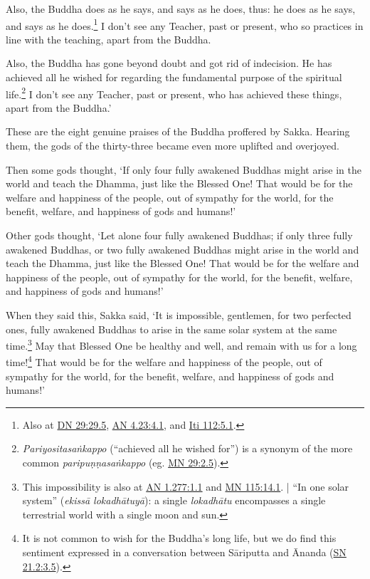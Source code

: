\documentclass[12pt,openany]{book}%
\begin{document}
Also, the Buddha does as he says, and says as he does, thus: he does as he says, and says as he does.\footnote{Also at \href{https://suttacentral.net/dn29/en/sujato\#29.5}{DN 29:29.5}, \href{https://suttacentral.net/an4.23/en/sujato\#4.1}{AN 4.23:4.1}, and \href{https://suttacentral.net/iti112/en/sujato\#5.1}{Iti 112:5.1}. } I don’t see any Teacher, past or present, who so practices in line with the teaching, apart from the Buddha. 

Also, the Buddha has gone beyond doubt and got rid of indecision. He has achieved all he wished for regarding the fundamental purpose of the spiritual life.\footnote{\textit{\textsanskrit{Pariyositasaṅkappo}} (“achieved all he wished for”) is a synonym of the more common \textit{\textsanskrit{paripuṇṇasaṅkappo}} (eg. \href{https://suttacentral.net/mn29/en/sujato\#2.5}{MN 29:2.5}). } I don’t see any Teacher, past or present, who has achieved these things, apart from the Buddha.’ 

These are the eight genuine praises of the Buddha proffered by Sakka. Hearing them, the gods of the thirty-three became even more uplifted and overjoyed. 

Then some gods thought, ‘If only four fully awakened Buddhas might arise in the world and teach the Dhamma, just like the Blessed One! That would be for the welfare and happiness of the people, out of sympathy for the world, for the benefit, welfare, and happiness of gods and humans!’ 

Other gods thought, ‘Let alone four fully awakened Buddhas; if only three fully awakened Buddhas, or two fully awakened Buddhas might arise in the world and teach the Dhamma, just like the Blessed One! That would be for the welfare and happiness of the people, out of sympathy for the world, for the benefit, welfare, and happiness of gods and humans!’ 

When they said this, Sakka said, ‘It is impossible, gentlemen, for two perfected ones, fully awakened Buddhas to arise in the same solar system at the same time.\footnote{This impossibility is also at \href{https://suttacentral.net/an1.277/en/sujato\#1.1}{AN 1.277:1.1} and \href{https://suttacentral.net/mn115/en/sujato\#14.1}{MN 115:14.1}. | “In one solar system” (\textit{\textsanskrit{ekissā} \textsanskrit{lokadhātuyā}}): a single \textit{\textsanskrit{lokadhātu}} encompasses a single terrestrial world with a single moon and sun. } May that Blessed One be healthy and well, and remain with us for a long time!\footnote{It is not common to wish for the Buddha’s long life, but we do find this sentiment expressed in a conversation between \textsanskrit{Sāriputta} and Ānanda (\href{https://suttacentral.net/sn21.2/en/sujato\#3.5}{SN 21.2:3.5}). } That would be for the welfare and happiness of the people, out of sympathy for the world, for the benefit, welfare, and happiness of gods and humans!’ 
\end{document}
